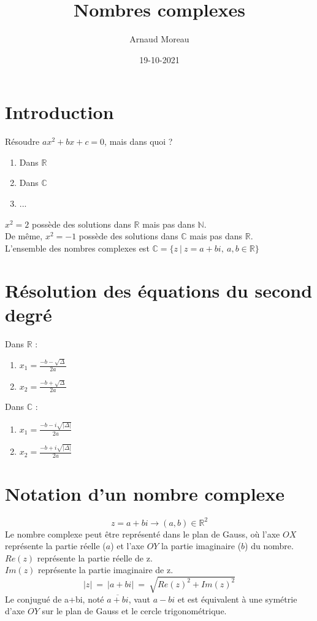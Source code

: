 \documentclass[]{article}
\title{Nombres complexes}
\date{19-10-2021}
\author{Arnaud Moreau}
\begin{document}
\maketitle
\newpage

\noindent
\section{Introduction}
\noindent
Résoudre $ax^2+bx+c=0$, mais dans quoi ?
\begin{enumerate}
\item{Dans $\mathbb{R}$}
\item{Dans $\mathbb{C}$}
\item{...}
\end{enumerate}
$x^2 = 2$ possède des solutions dans $\mathbb{R}$ mais pas dans $\mathbb{N}$.
\\ De même, $x^2 = -1$ possède des solutions dans $\mathbb{C}$ mais pas dans $\mathbb{R}$.
\\ L'ensemble des nombres complexes est $\mathbb{C} = \{z \ | \ z = a+bi, \ a, b \in \mathbb{R}\}$


\section{Résolution des équations du second degré}
\noindent
Dans $\mathbb{R}$ :
\begin{enumerate}
\item{$x_1 = \frac{-b-\sqrt{\Delta}}{2a}$}
\item{$x_2 = \frac{-b+\sqrt{\Delta}}{2a}$}
\end{enumerate}
Dans $\mathbb{C}$ :
\begin{enumerate}
\item{$x_1 = \frac{-b-i\sqrt{|\Delta|}}{2a}$}
\item{$x_2 = \frac{-b+i\sqrt{|\Delta|}}{2a}$}
\end{enumerate}

\section{Notation d'un nombre complexe}
\noindent
\[
z = a+bi \longrightarrow (a, b) \in \mathbb{R}^2
\]
Le nombre complexe peut être représenté dans le plan de Gauss, où l'axe $OX$ représente la partie réelle ($a$) et l'axe $OY$ la partie imaginaire ($b$) du nombre.
\\ $Re(z)$ représente la partie réelle de z.
\\ $Im(z)$ représente la partie imaginaire de z.
\[
|z| \ = \ |a+bi| \ = \ \sqrt{Re(z)^2+Im(z)^2}
\]
Le conjugué de a+bi, noté $\overline{a+bi}$, vaut $a-bi$ et est équivalent à une symétrie d'axe $OY$ sur le plan de Gauss et le cercle trigonométrique.
\end{document}
